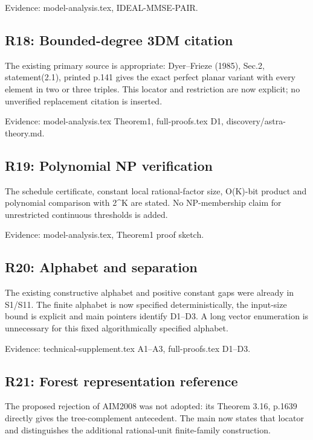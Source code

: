 \documentclass[10pt]{article}
\begin{document}
{\small Evidence: model-analysis.tex, IDEAL-MMSE-PAIR.}

\subsection*{R18: Bounded-degree 3DM citation}

The existing primary source is appropriate: Dyer--Frieze (1985), Sec.2, statement(2.1), printed p.141 gives the exact perfect planar variant with every element in two or three triples. This locator and restriction are now explicit; no unverified replacement citation is inserted.

{\small Evidence: model-analysis.tex Theorem1, full-proofs.tex D1, discovery/\allowbreak astra-theory.md.}

\subsection*{R19: Polynomial NP verification}

The schedule certificate, constant local rational-factor size, O(K)-bit product and polynomial comparison with 2\textasciicircum{}K are stated. No NP-membership claim for unrestricted continuous thresholds is added.

{\small Evidence: model-analysis.tex, Theorem1 proof sketch.}

\subsection*{R20: Alphabet and separation}

The existing constructive alphabet and positive constant gaps were already in S1/\allowbreak S11. The finite alphabet is now specified deterministically, the input-size bound is explicit and main pointers identify D1--D3. A long vector enumeration is unnecessary for this fixed algorithmically specified alphabet.

{\small Evidence: technical-supplement.tex A1--A3, full-proofs.tex D1--D3.}

\subsection*{R21: Forest representation reference}

The proposed rejection of AIM2008 was not adopted: its Theorem 3.16, p.1639 directly gives the tree-complement antecedent. The main now states that locator and distinguishes the additional rational-unit finite-family construction.
\end{document}
